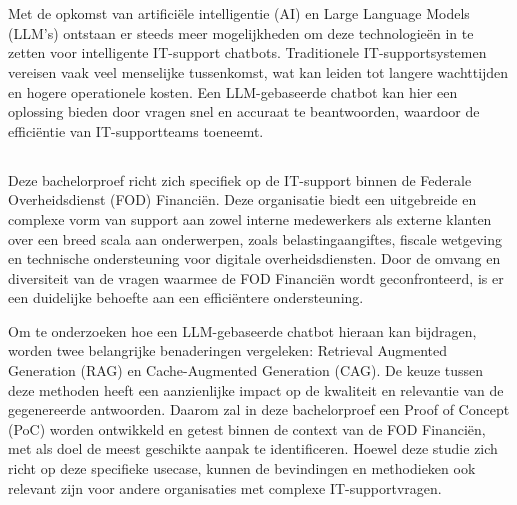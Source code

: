 
\chapter{}%
\label{ch:inleiding}

Met de opkomst van artificiële intelligentie (AI) en Large Language Models (LLM’s) ontstaan er steeds meer mogelijkheden om deze technologieën in te zetten voor intelligente IT-support chatbots. Traditionele IT-supportsystemen vereisen vaak veel menselijke tussenkomst, wat kan leiden tot langere wachttijden en hogere operationele kosten. Een LLM-gebaseerde chatbot kan hier een oplossing bieden door vragen snel en accuraat te beantwoorden, waardoor de efficiëntie van IT-supportteams toeneemt.

\section{}%
\label{sec:probleemstelling}

Deze bachelorproef richt zich specifiek op de IT-support binnen de Federale Overheidsdienst (FOD) Financiën. Deze organisatie biedt een uitgebreide en complexe vorm van support aan zowel interne medewerkers als externe klanten over een breed scala aan onderwerpen, zoals belastingaangiftes, fiscale wetgeving en technische ondersteuning voor digitale overheidsdiensten. Door de omvang en diversiteit van de vragen waarmee de FOD Financiën wordt geconfronteerd, is er een duidelijke behoefte aan een efficiëntere ondersteuning.

Om te onderzoeken hoe een LLM-gebaseerde chatbot hieraan kan bijdragen, worden twee belangrijke benaderingen vergeleken: Retrieval Augmented Generation (RAG) en Cache-Augmented Generation (CAG). De keuze tussen deze methoden heeft een aanzienlijke impact op de kwaliteit en relevantie van de gegenereerde antwoorden. Daarom zal in deze bachelorproef een Proof of Concept (PoC) worden ontwikkeld en getest binnen de context van de FOD Financiën, met als doel de meest geschikte aanpak te identificeren. Hoewel deze studie zich richt op deze specifieke usecase, kunnen de bevindingen en methodieken ook relevant zijn voor andere organisaties met complexe IT-supportvragen.

